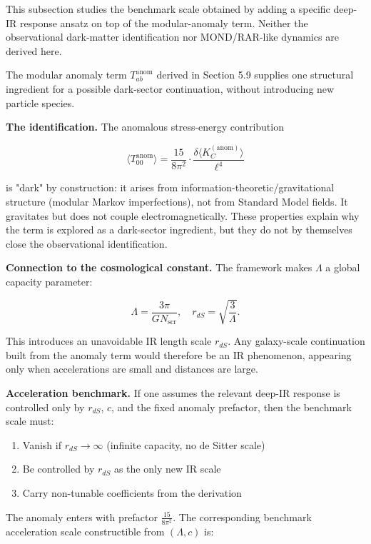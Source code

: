This subsection studies the benchmark scale obtained by adding a specific deep-IR response ansatz on top of the modular-anomaly term. Neither the observational dark-matter identification nor MOND/RAR-like dynamics are derived here.

The modular anomaly term \(T_{ab}^{\mathrm{anom}}\) derived in Section 5.9 supplies one structural ingredient for a possible dark-sector continuation, without introducing new particle species.

\textbf{The identification.} The anomalous stress-energy contribution

\[
\langle T_{00}^{\mathrm{anom}} \rangle
= \frac{15}{8\pi^2} \cdot \frac{\delta \langle K_C^{\mathrm{(anom)}} \rangle}{\ell^4}
\]

is "dark" by construction: it arises from information-theoretic/gravitational structure (modular Markov imperfections), not from Standard Model fields. It gravitates but does not couple electromagnetically. These properties explain why the term is explored as a dark-sector ingredient, but they do not by themselves close the observational identification.

\textbf{Connection to the cosmological constant.} The framework makes \(\Lambda\) a global capacity parameter:

\[
\Lambda = \frac{3\pi}{G N_{\mathrm{scr}}},
\quad
r_{dS} = \sqrt{\frac{3}{\Lambda}}.
\]

This introduces an unavoidable IR length scale \(r_{dS}\). Any galaxy-scale continuation built from the anomaly term would therefore be an IR phenomenon, appearing only when accelerations are small and distances are large.

\textbf{Acceleration benchmark.} If one assumes the relevant deep-IR response is controlled only by \(r_{dS}\), \(c\), and the fixed anomaly prefactor, then the benchmark scale must:

\begin{enumerate}
\def\labelenumi{\arabic{enumi}.}
\tightlist
\item
  Vanish if \(r_{dS} \to \infty\) (infinite capacity, no de Sitter scale)
\item
  Be controlled by \(r_{dS}\) as the only new IR scale
\item
  Carry non-tunable coefficients from the derivation
\end{enumerate}

The anomaly enters with prefactor \(\frac{15}{8\pi^2}\). The corresponding benchmark acceleration scale constructible from \((\Lambda, c)\) is:

